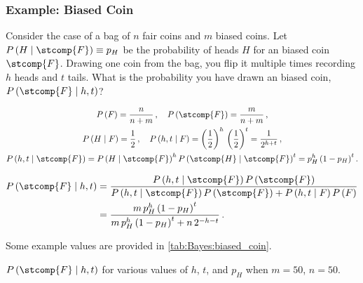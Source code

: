 \subsubsection{Example: Biased Coin}
\label{stats:Bayes:biased_coin}

Consider the case of a bag of $n$ fair coins and $m$ biased coins.
Let $P\left(H \mid \stcomp{F}\right) \equiv p_{H}$ be the \apriori probability of heads $H$ for an biased coin $\stcomp{F}$.
Drawing one coin from the bag, you flip it multiple times recording $h$ heads and $t$ tails.
What is the probability you have drawn an biased coin, $P\left(\stcomp{F} \mid h,t\right)$?

\begin{equation}\label{eq:stats:Bayes:biased_coin_setup}
\begin{gathered}
P\left(F\right) = \frac{n}{n+m}\,,\quad P\left(\stcomp{F}\right) = \frac{m}{n+m}\,, \\
P\left(H \mid F\right) = \frac{1}{2}\,,\quad P\left(h,t \mid F\right) = \left(\frac{1}{2}\right)^{h}\,\left(\frac{1}{2}\right)^{t} = \frac{1}{2^{h+t}}\,, \\
P\left(h,t \mid \stcomp{F}\right) = P\left(H \mid \stcomp{F}\right)^{h} P\left(\stcomp{H} \mid \stcomp{F}\right)^{t} = p_{H}^{h} \left(1-p_{H}\right)^{t}.
\end{gathered}
\end{equation}

\begin{equation}\label{eq:stats:Bayes:biased_coin_solution}
\begin{split}
P\left(\stcomp{F} \mid h,t\right) &= \frac{
P\left(h,t \mid \stcomp{F}\right) P\left(\stcomp{F}\right)}{
P\left(h,t \mid \stcomp{F}\right) P\left(\stcomp{F}\right) + P\left(h,t \mid F\right) P\left(F\right)} \\
&= \frac{
m\,p_{H}^{h} \left(1-p_{H}\right)^{t}}{
m\,p_{H}^{h} \left(1-p_{H}\right)^{t} + n\,2^{-h-t}}\,.
\end{split}
\end{equation}

Some example values are provided in \cref{tab:Bayes:biased_coin}.

\begin{table}[H]
\centering
\begingroup
\renewcommand*{\arraystretch}{1}

\endgroup
\caption{
$P\left(\stcomp{F} \mid h,t\right)$ for various values of $h$, $t$, and $p_{H}$ when $m = 50$, $n = 50$.
}
\label{tab:Bayes:biased_coin}
\end{table}

